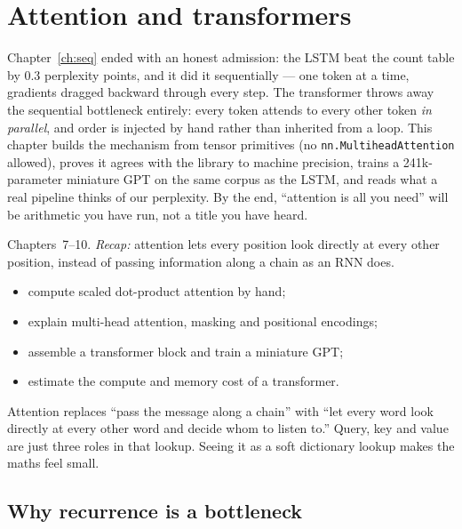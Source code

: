 \chapter{Attention and transformers}
\label{ch:attn}

Chapter~\ref{ch:seq} ended with an honest admission: the LSTM beat
the count table by 0.3 perplexity points, and it did it sequentially
--- one token at a time, gradients dragged backward through every
step. The transformer throws away the sequential
bottleneck entirely: every token attends to every other token
\emph{in parallel}, and order is injected by hand rather than
inherited from a loop. This chapter builds the mechanism from tensor
primitives (no \texttt{nn.MultiheadAttention} allowed), proves it
agrees with the library to machine precision, trains a 241k-parameter
miniature GPT on the same corpus as the LSTM, and reads what a real
pipeline thinks of our perplexity. By the end, ``attention is all you
need'' will be arithmetic you have run, not a title you have heard.

\begin{rulebox}
Chapters~7--10. \emph{Recap:} attention lets every position look directly at every other position, instead of passing information along a chain as an RNN does.
\end{rulebox}
\begin{wins}
\begin{itemize}
\item compute scaled dot-product attention by hand;
\item explain multi-head attention, masking and positional encodings;
\item assemble a transformer block and train a miniature GPT;
\item estimate the compute and memory cost of a transformer.
\end{itemize}
\end{wins}
\begin{principle}
Attention replaces ``pass the message along a chain'' with ``let every word look directly at every other word and decide whom to listen to.'' Query, key and value are just three roles in that lookup. Seeing it as a soft dictionary lookup makes the maths feel small.
\end{principle}

\section{Why recurrence is a bottleneck}
\label{sec:bottleneck}

